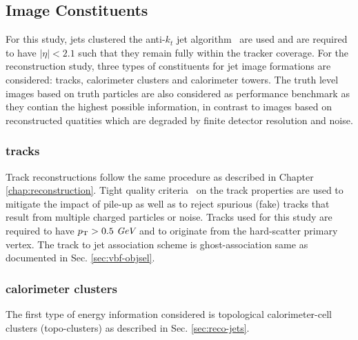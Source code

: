 \label{sec:cnn-image}
\subsection{Image Constituents}
For this study, jets clustered the anti-$k_t$ jet algorithm~\cite{Cacciari:2008gp}
are used and are required to have $|\eta|<2.1$ such that they remain fully within the
tracker coverage.
For the reconstruction study, three types of constituents for jet image formations
are considered: tracks, calorimeter clusters and calorimeter towers. The truth level images
based on truth particles are also considered as performance benchmark as they
contian the highest possible information, in contrast to images based on reconstructed quatities which are degraded by
finite detector resolution and noise. 

\subsubsection{tracks}
Track reconstructions follow the same procedure as described in Chapter \ref{chap:reconstruction}. Tight quality
criteria~\cite{ATL-PHYS-PUB-2015-051} on the track properties are used to mitigate the impact of pile-up as well as
to reject spurious (fake) tracks that result from multiple charged particles or noise.
Tracks used for this study are required to have $p_\text{T} > 0.5~\textit{GeV}$ and to originate from the hard-scatter primary vertex. 
The track to jet association scheme is ghost-association same as documented in Sec. \ref{sec:vbf-objsel}.


\subsubsection{calorimeter clusters}
The first type of energy information considered is topological calorimeter-cell 
clusters (topo-clusters) as described in Sec. \ref{sec:reco-jets}.


